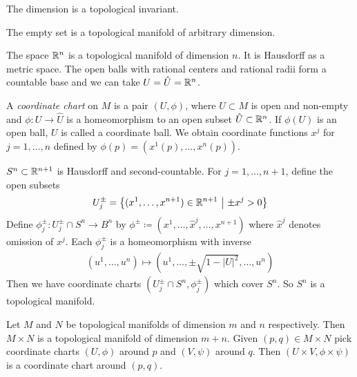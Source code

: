 \documentclass{skript}
\begin{document}
\begin{fact}
    The dimension is a topological invariant.
\end{fact}

\begin{note}
    The empty set is a topological manifold of arbitrary dimension.
\end{note}

\begin{bsp}
    The space $\mathbb{R}^n$ is a topological manifold of dimension $n$. It is Hausdorff as a metric space. The open balls with rational centers and rational radii form a countable base and we can take $U=\hat U = \mathbb{R}^n$.
\end{bsp}

\begin{definition}\label{def:coordchar}
    A \emph{coordinate chart} on $M$ is a pair $(U, \phi)$, where $U\subset M$ is open and non-empty and $\phi\colon U\to \hat U$ is a homeomorphism to an open subset $\hat U \subset \mathbb{R}^n$. 
    If $\phi(U)$ is an open ball, $U$ is called a coordinate ball.
    We obtain coordinate functions $x^j$ for $j=1,\dots, n$ defined by $\phi(p) = (x^1(p), \dots, x^n(p))$.
\end{definition}

\begin{bsp}[Spheres]
    $S^n\subset \mathbb{R}^{n+1}$ is Hausdorff and second-countable.
    For $j=1, \dots, n+1$, define the open subsets 
    \begin{align*}
        U^\pm_j = \left\{(x^1, \dots, x^{n+1})\in \mathbb{R}^{n+1}\ \middle|\  \pm x^j > 0\right\}
    \end{align*}
Define $\phi^\pm_j\colon U^\pm_j \cap S^n \to B^n$ by $\phi^\pm \coloneqq (x^1, \dots, \hat{x}^j, \dots, x^{n+1})$ where $\hat{x}^j$ denotes omission of $x^j$.
    Each $\phi^\pm_j$ is a homeomorphism with inverse 
    \begin{align*}
        (u^1, \dots, u^n) \mapsto \left(u^1,\dots, \pm\sqrt{1-|U|^2}, \dots, u^n\right)
    \end{align*}
    Then we have coordinate charts $(U^\pm_j\cap S^n, \phi^\pm_j)$ which cover $S^n$.
    So $S^n$ is a topological manifold.
\end{bsp}

\begin{bsp}
    Let $M$ and $N$ be topological manifolds of dimension $m$ and $n$ respectively. 
    Then $M\times N$ is a topological manifold of dimension $m+n$. 
    Given $(p,q)\in M\times N$ pick coordinate charts $(U,\phi)$ around $p$ and $(V, \psi)$ around $q$. 
    Then $(U\times V, \phi\times\psi)$ is a coordinate chart around $(p,q)$.
\end{bsp}
\end{document}

